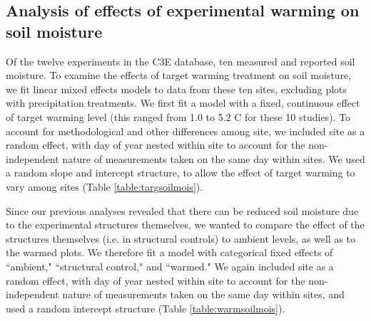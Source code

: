 \documentclass{article}
\begin{document}
\subsection* {Analysis of effects of experimental warming on soil moisture}
Of the twelve experiments in the C3E database, ten measured and reported soil moisture. To examine the effects of target warming treatment on soil moisture, we fit linear mixed effects models to data from these ten sites, excluding plots with precipitation treatments. We first fit a model with a fixed, continuous effect of target warming level (this ranged from 1.0 to 5.2 \degree C for these 10 studies). To account for methodological and other differences among site, we included site as a random effect, with day of year nested within site to account for the non-independent nature of measurements taken on the same day within sites.  We used a random slope and intercept structure, to allow the effect of target warming to vary among sites (Table \ref{table:targsoilmois}). 
\par Since our previous analyses revealed that there can be reduced soil moisture due to the experimental structures themselves, we wanted to compare the effect of the structures themselves (i.e. in structural controls) to ambient levels, as well as to the warmed plots. We therefore fit a model with categorical fixed effects of ``ambient," ``structural control," and ``warmed."  We again included site as a random effect, with day of year nested within site to account for the non-independent nature of measurements taken on the same day within sites, and used a random intercept structure (Table \ref{table:warmsoilmois}). 


\clearpage
\end{document}
